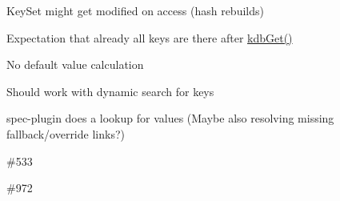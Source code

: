 
\begin{DoxyItemize}
\item Key\+Set might get modified on access (hash rebuilds)
\item Expectation that already all keys are there after {\ttfamily \hyperlink{group__kdb_ga28e385fd9cb7ccfe0b2f1ed2f62453a1}{kdb\+Get()}}
\item No default value calculation
\end{DoxyItemize}


\begin{DoxyItemize}
\item Should work with dynamic search for keys
\end{DoxyItemize}


\begin{DoxyItemize}
\item spec-\/plugin does a lookup for values (Maybe also resolving missing fallback/override links?)
\end{DoxyItemize}


\begin{DoxyItemize}
\item \#533
\item \#972 
\end{DoxyItemize}